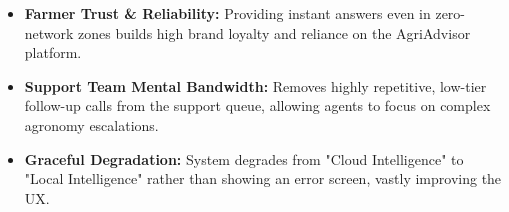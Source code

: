 \documentclass[10pt,a4paper]{article}
\begin{document}
\vspace{6mm}

\noindent
{}
\vspace{1mm}

\begin{itemize}[leftmargin=*, label=\textcolor{brandblue}{\textnormal{\faCheck}}, itemsep=2pt]
    \item \textbf{Farmer Trust \& Reliability:} Providing instant answers even in zero-network zones builds high brand loyalty and reliance on the AgriAdvisor platform.
    \item \textbf{Support Team Mental Bandwidth:} Removes highly repetitive, low-tier follow-up calls from the support queue, allowing agents to focus on complex agronomy escalations.
    \item \textbf{Graceful Degradation:} System degrades from "Cloud Intelligence" to "Local Intelligence" rather than showing an error screen, vastly improving the UX.
\end{itemize}
\end{document}
